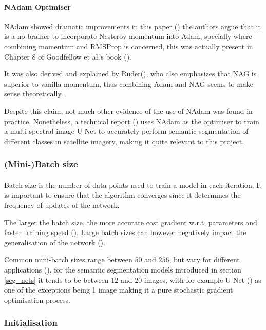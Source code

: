 \paragraph{\gls{NAdam} Optimiser}
\gls{NAdam} showed dramatic improvements in this paper (\cite{nadam}) the authors argue that it is a no-brainer to incorporate Nesterov momentum into \gls{Adam}, specially where combining momentum and \gls{RMSProp} is concerned, this was actually present in Chapter 8 of Goodfellow et al.'s book (\cite{GoodBengCour16}).

It was also derived and explained by Ruder(\cite{ruder2017overview}), who also emphasizes that \gls{NAG} is superior to vanilla momentum, thus combining \gls{Adam} and NAG seems to make sense theoretically. 

Despite this claim, not much other evidence of the use of \gls{NAdam} was found in practice. Nonetheless, a technical report (\cite{DBLP:journals/corr/IglovikovMO17}) uses \gls{NAdam} as the optimiser to train a multi-spectral image U-Net to accurately perform semantic segmentation of different classes in satellite imagery, making it quite relevant to this project.
\subsubsection{(Mini-)Batch size} \label{batch_size}
\paragraph{}
Batch size is the number of data points used to train a model in each iteration. It is important to ensure that the algorithm converges since it determines the frequency of updates of the network.

The larger the batch size, the more accurate cost gradient \gls{w.r.t.} parameters and faster training speed (\cite{deeplearning_ai}). Large batch sizes can however negatively impact the generalisation of the network (\cite{keskar2017largebatch}).

Common mini-batch sizes range between $50$ and $256$, but vary for different applications (\cite{ruder2017overview}), for the semantic segmentation models introduced in section \ref{seg_nets} it tends to be between $12$ and $20$ images, with for example U-Net (\cite{ronneberger2015unet}) as one of the exceptions being 1 image making it a pure stochastic gradient optimisation process.
\subsubsection{Initialisation} \label{initialisation}
